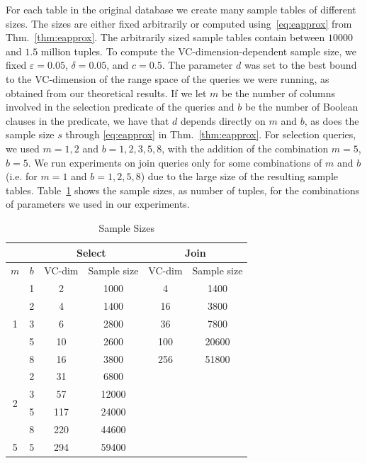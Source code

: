 For each table in the original database we create many sample tables of
different sizes. The sizes are either fixed arbitrarily or computed
using~\eqref{eq:eapprox} from Thm.~\ref{thm:eapprox}. The arbitrarily sized
sample tables contain between $10000$ and $1.5$ million tuples. To compute the
VC-dimension-dependent sample size, we fixed $\varepsilon=0.05$,
$\delta=0.05$, and $c=0.5$. The parameter $d$ was set to the best bound to the
VC-dimension of the range space of the queries we were running, as obtained from
our theoretical results. If we let $m$ be the number of columns involved in the
selection predicate of the queries and $b$ be the number of Boolean clauses in
the predicate, we have that $d$ depends directly on $m$ and $b$, as does the
sample size $s$ through \eqref{eq:eapprox} in Thm.~\ref{thm:eapprox}. For
selection queries, we used $m=1,2$ and $b=1,2,3,5,8$, with the addition of the
combination $m=5$, $b=5$. We run experiments on join queries only for some
combinations of $m$ and $b$ (i.e. for $m=1$ and $b=1,2,5,8$) due to the large
size of the resulting sample tables. Table~\ref{tab:samplesize} shows the sample
sizes, as number of tuples, for the combinations of parameters we used in our
experiments.

\begin{table}[ht]
  \centering
  \begin{tabular}{|c|c|cc|cc|}
    \cline{3-6}
    \multicolumn{2}{c}{$ $} &
    \multicolumn{2}{|c}{Select} &
    \multicolumn{2}{|c|}{Join} \\
    \hline
    $m$ & $b$ & VC-dim & Sample size & VC-dim & Sample size \\
    \hline
    \multirow{5}{*}{1} & 1 & 2 & 1000 & 4 & 1400\\
     & 2 & 4 & 1400 & 16 & 3800\\
     & 3 & 6 & 2800 & 36 & 7800 \\
     & 5 & 10 & 2600 & 100 & 20600\\
     & 8 & 16 & 3800 & 256 & 51800\\
    \hline
    \multirow{4}{*}{2} & 2 & 31 & 6800  & & \\
     & 3 & 57 & 12000 & & \\
     & 5 & 117 & 24000 & & \\
     & 8 & 220 & 44600 & & \\
    \hline
    5 & 5 & 294 & 59400 & & \\
    \hline
  \end{tabular}
  \caption{Sample Sizes}
  \label{tab:samplesize}
\end{table}
 
